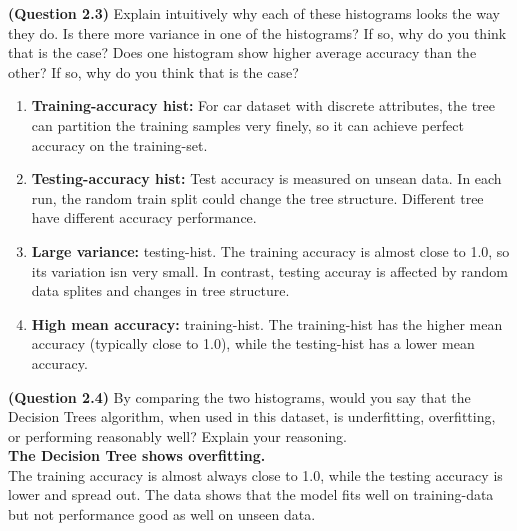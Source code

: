 \documentclass{article}
\begin{document}
    \item \textbf{(Question 2.3)} Explain intuitively why each of these histograms looks the way they do. Is there more variance in one of the histograms? If so, why do you think that is the case? Does one histogram show higher average accuracy than the other? If so, why do you think that is the case?
\begin{enumerate}
    \item \textbf{Training-accuracy hist:} For car dataset with discrete attributes, the tree can partition the training samples very finely, so it can achieve perfect accuracy on the training-set.
    \item \textbf{Testing-accuracy hist:} Test accuracy is measured on unsean data. In each run, the random train split could change the tree structure. Different tree have different accuracy performance.
    \item \textbf{Large variance: }testing-hist. The training accuracy is almost close to 1.0, so its variation isn very small. In contrast, testing accuray is affected by random data splites and changes in tree structure.
    \item \textbf{High mean accuracy: }training-hist. The training-hist has the higher mean accuracy (typically close to 1.0), while the testing-hist has a lower mean accuracy.
\end{enumerate}



    \item \textbf{(Question 2.4)} By comparing the two histograms, would you say that the Decision Trees algorithm, when used in this dataset, is underfitting, overfitting, or performing reasonably well? Explain your reasoning.
\\
\textbf{The Decision Tree shows overfitting.}\\
The training accuracy is almost always close to 1.0, while the testing accuracy is lower and spread out. The data shows that the model fits well on training-data but not performance good as well on unseen data.
\end{document}
